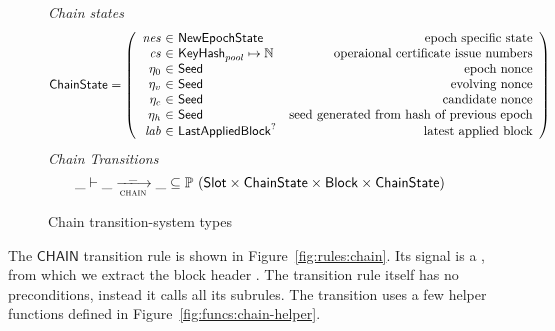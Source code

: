 \begin{figure}
  \emph{Chain states}
  \begin{equation*}
    \ChainState =
    \left(
      \begin{array}{r@{~\in~}lr}
        \var{nes} & \NewEpochState & \text{epoch specific state} \\
        \var{cs} & \KeyHash_{pool} \mapsto \N & \text{operaional certificate issue numbers} \\
        ~\eta_0 & \Seed & \text{epoch nonce} \\
        ~\eta_v & \Seed & \text{evolving nonce} \\
        ~\eta_c & \Seed & \text{candidate nonce} \\
        ~\eta_h & \Seed & \text{seed generated from hash of previous epoch} \\
        \var{lab} & \LastAppliedBlock^? & \text{latest applied block} \\
      \end{array}
    \right)
  \end{equation*}
  \emph{Chain Transitions}
  \begin{equation*}
    \_ \vdash \var{\_} \trans{chain}{\_} \var{\_} \subseteq
    \powerset (\Slot \times \ChainState \times \Block \times \ChainState)
  \end{equation*}
  \caption{Chain transition-system types}
  \label{fig:ts-types:chain}
\end{figure}

The $\mathsf{CHAIN}$ transition rule is shown in
Figure~\ref{fig:rules:chain}. Its signal is a , from which
we extract the block header .
The transition rule itself has no preconditions, instead it calls all its subrules.
The transition uses a few helper functions defined in Figure~\ref{fig:funcs:chain-helper}.

